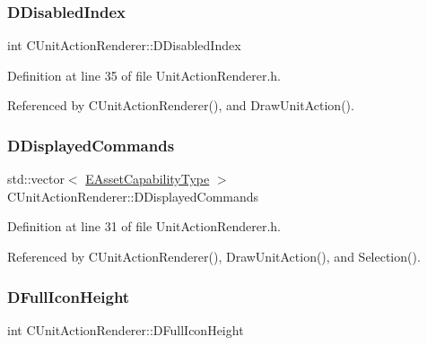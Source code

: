 \subsubsection{\texorpdfstring{D\+Disabled\+Index}{DDisabledIndex}}
{\footnotesize\ttfamily int C\+Unit\+Action\+Renderer\+::\+D\+Disabled\+Index\hspace{0.3cm}{\ttfamily [protected]}}



Definition at line 35 of file Unit\+Action\+Renderer.\+h.



Referenced by C\+Unit\+Action\+Renderer(), and Draw\+Unit\+Action().

\hypertarget{classCUnitActionRenderer_a194c87c9f3280485f4abceb8d39853b3}{}\label{classCUnitActionRenderer_a194c87c9f3280485f4abceb8d39853b3} 
\subsubsection{\texorpdfstring{D\+Displayed\+Commands}{DDisplayedCommands}}
{\footnotesize\ttfamily std\+::vector$<$ \hyperlink{GameDataTypes_8h_a35b98ce26aca678b03c6f9f76e4778ce}{E\+Asset\+Capability\+Type} $>$ C\+Unit\+Action\+Renderer\+::\+D\+Displayed\+Commands\hspace{0.3cm}{\ttfamily [protected]}}



Definition at line 31 of file Unit\+Action\+Renderer.\+h.



Referenced by C\+Unit\+Action\+Renderer(), Draw\+Unit\+Action(), and Selection().

\hypertarget{classCUnitActionRenderer_a11b30763b92ed0cbfb842f86fe76fe26}{}\label{classCUnitActionRenderer_a11b30763b92ed0cbfb842f86fe76fe26} 
\subsubsection{\texorpdfstring{D\+Full\+Icon\+Height}{DFullIconHeight}}
{\footnotesize\ttfamily int C\+Unit\+Action\+Renderer\+::\+D\+Full\+Icon\+Height\hspace{0.3cm}{\ttfamily [protected]}}



